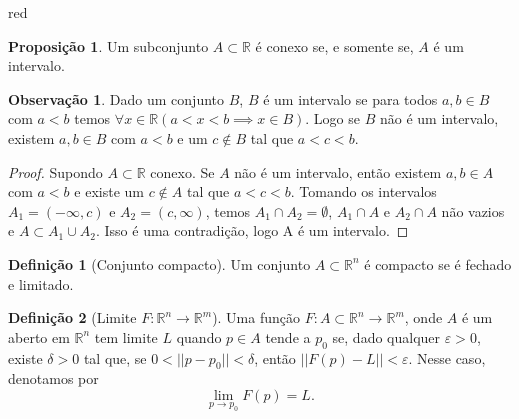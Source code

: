 \documentclass[12pt,leqno,twoside]{amsart}
\theoremstyle{definition}
\newtheorem{proposicao}{Proposição}[section]
\newtheorem{definicao}{Definição}[section]
\newtheorem*{obs}{Observação}
\begin{document}
\begin{color}{red}
\vspace{0.3cm}

\begin{proposicao}
	\label{prop:conexset}
	Um subconjunto $A\subset \mathbb{R}$ é conexo se, e somente se, $A$ é um intervalo.
\end{proposicao}

\vspace{0.3cm}

\begin{obs}
	Dado um conjunto $B$, $B$ é 	um intervalo se para todos $a,b \in B$ com $a<b$ temos $\forall x \in \mathbb R (  a < x< b \implies x \in B)$. Logo se $B$ não é um intervalo, existem $a,b\in B$ com $a<b$ e um $c \not \in B$   tal que $ a<c<b$.
\end{obs}

\vspace{0.3cm}

\begin{proof}
	Supondo $A \subset \mathbb{R} $ conexo. Se $A$ não é um intervalo, então existem $a,b \in A$ com $a<b$ e existe um $c\not \in A$ tal que $a <c<b$. Tomando os intervalos $A_1 = (-\infty, c)$ e $A_2 = (c, \infty)$, temos $A_1 \cap A_2 = \emptyset$,  $A_1\cap A$ e $A_2\cap A$  não vazios e $A \subset A_1 \cup A_2$. Isso é uma contradição, logo A é um intervalo.



\end{proof}

\vspace{0.3cm}

\begin{definicao}[Conjunto compacto]
	Um conjunto $A\subset\mathbb{R}^n$ é compacto se é fechado e limitado.
\end{definicao}

\vspace{0.3cm}

\begin{definicao}[Limite $F:\mathbb{R}^n \to \mathbb{R}^m$]
	Uma função $F:A \subset \mathbb{R}^n \to \mathbb{R}^m$, onde  $A$ é um aberto em $\mathbb{R}^n$ tem limite $L$ quando $p\in A$ tende a $p_0$ se, dado qualquer $\varepsilon >0$, existe $\delta > 0$ tal que, se $0< ||p -p_0|| < \delta$, então $||F(p) - L || < \varepsilon$.  Nesse caso, denotamos por $$\lim_{p\to p_0} F(p) = L.$$
\end{definicao}

\vspace{0.3cm}


\end{color}
\end{document}
